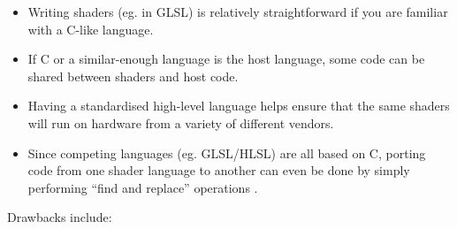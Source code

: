 \documentclass[a4paper,12pt,twoside,openright]{report}
\begin{document}
\begin{itemize}

    \item Writing shaders (eg. in GLSL) is relatively straightforward if you
    are familiar with a C-like language.

    \item If C or a similar-enough language is the host language, some code can
    be shared between shaders and host code.

    \item Having a standardised high-level language helps ensure that the same
    shaders will run on hardware from a variety of different vendors.

    \item Since competing languages (eg. GLSL/HLSL) are all based on C, porting
    code from one shader language to another can even be done by simply
    performing ``find and replace'' operations \cite{PS4PortCrew}.

\end{itemize}

Drawbacks include:
\end{document}

